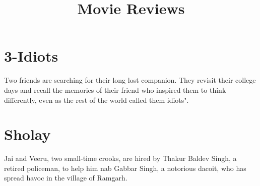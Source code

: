 \documentclass{article}
\title{Movie Reviews}
\begin{document}
	\maketitle
	\section{3-Idiots}
	\large{Two friends are searching for their long lost companion. They revisit their college days and recall the memories of their friend who inspired them to think differently, even as the rest of the world called them idiots".}
	\section{Sholay}
	\large{Jai and Veeru, two small-time crooks, are hired by Thakur Baldev Singh, a retired policeman, to help him nab Gabbar Singh, a notorious dacoit, who has spread havoc in the village of Ramgarh.}
\end{document}
